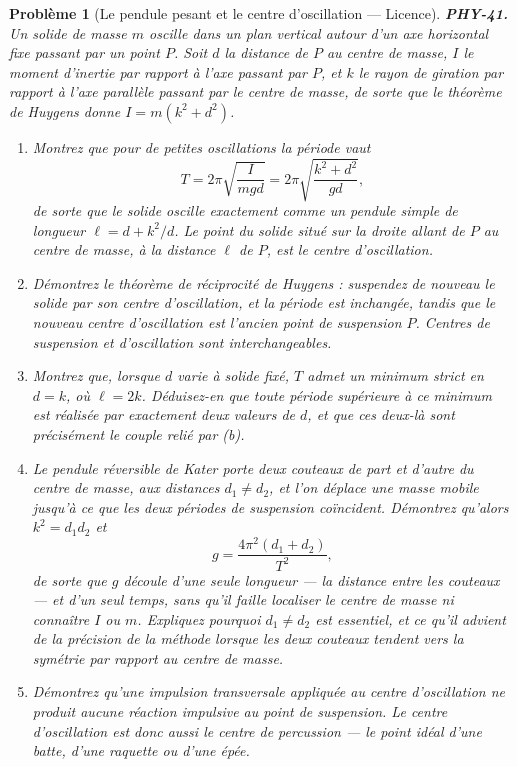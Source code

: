 \documentclass[11pt]{article}
\newtheorem{problem}{Problème}
\begin{document}
\begin{problem}[{Le pendule pesant et le centre d'oscillation --- Licence}]
\textbf{PHY-41.} Un solide de masse $ m $ oscille dans un plan vertical autour d'un axe
horizontal fixe passant par un point $ P $. Soit $ d $ la distance de $ P $ au centre de
masse, $ I $ le moment d'inertie par rapport à l'axe passant par $ P $, et $ k $ le rayon de
giration par rapport à l'axe parallèle passant par le centre de masse, de sorte que le théorème
de Huygens donne $ I = m(k^{2} + d^{2}) $.
\begin{enumerate}
\item[(a)] Montrez que pour de petites oscillations la période vaut
\[ T = 2\pi\sqrt{\frac{I}{mgd}} = 2\pi\sqrt{\frac{k^{2}+d^{2}}{gd}}, \]
de sorte que le solide oscille exactement comme un pendule simple de longueur
$ \ell = d + k^{2}/d $. Le point du solide situé sur la droite allant de $ P $ au centre de
masse, à la distance $ \ell $ de $ P $, est le \textit{centre d'oscillation}.
\item[(b)] Démontrez le théorème de réciprocité de Huygens : suspendez de nouveau le solide par son
centre d'oscillation, et la période est inchangée, tandis que le nouveau centre d'oscillation est
l'ancien point de suspension $ P $. Centres de suspension et d'oscillation sont
interchangeables.
\item[(c)] Montrez que, lorsque $ d $ varie à solide fixé, $ T $ admet un minimum strict en
$ d = k $, où $ \ell = 2k $. Déduisez-en que toute période supérieure à ce minimum est
réalisée par exactement deux valeurs de $ d $, et que ces deux-là sont précisément le couple
relié par (b).
\item[(d)] Le pendule réversible de Kater porte deux couteaux de part et d'autre du centre de masse, aux
distances $ d_{1} \neq d_{2} $, et l'on déplace une masse mobile jusqu'à ce que les deux
périodes de suspension coïncident. Démontrez qu'alors $ k^{2} = d_{1}d_{2} $ et
\[ g = \frac{4\pi^{2}(d_{1}+d_{2})}{T^{2}}, \]
de sorte que $ g $ découle d'une seule longueur --- la distance entre les couteaux --- et d'un seul
temps, sans qu'il faille localiser le centre de masse ni connaître $ I $ ou $ m $. Expliquez
pourquoi $ d_{1} \neq d_{2} $ est essentiel, et ce qu'il advient de la précision de la méthode
lorsque les deux couteaux tendent vers la symétrie par rapport au centre de masse.
\item[(e)] Démontrez qu'une impulsion transversale appliquée au centre d'oscillation ne produit aucune
réaction impulsive au point de suspension. Le centre d'oscillation est donc aussi le centre de
percussion --- le point idéal d'une batte, d'une raquette ou d'une épée.
\end{enumerate}

\end{problem}
\end{document}

